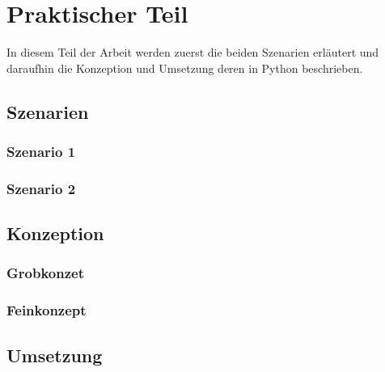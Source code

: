 \chapter{Praktischer Teil}
    \label{sec:praktischerteil}
In diesem Teil der Arbeit werden zuerst die beiden Szenarien erläutert und daraufhin die Konzeption und Umsetzung deren in Python beschrieben.
    \section{Szenarien}
    \label{subsec:szenarien}

    \subsection{Szenario 1}
    \label{subsubsec:szenario1}

    \subsection{Szenario 2}
    \label{subsubsec:szenario2}

    \section{Konzeption}
    \label{subsection:konzeption}

    \subsection{Grobkonzet}
    \label{subsubsec:grobkonzept}

    \subsection{Feinkonzept}
    \label{subsubsec:feinkonzept}

    \section{Umsetzung}
    \label{umsetzung}

    \newpage
